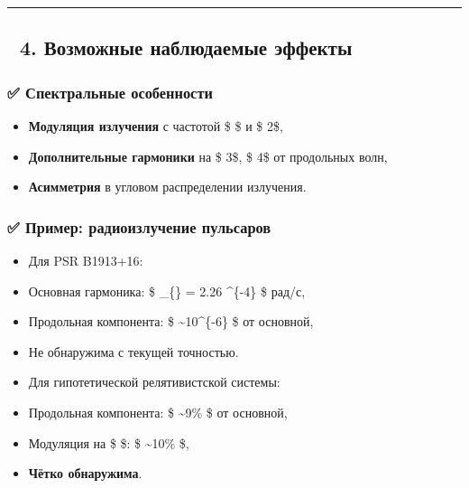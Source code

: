 \documentclass[11pt]{article}
\providecommand{\tightlist}{%
      \setlength{\itemsep}{0pt}\setlength{\parskip}{0pt}}
\begin{document}
\begin{center}\rule{0.5\linewidth}{\linethickness}\end{center}

\subsection{🔹 4. Возможные наблюдаемые
эффекты}\label{ux432ux43eux437ux43cux43eux436ux43dux44bux435-ux43dux430ux431ux43bux44eux434ux430ux435ux43cux44bux435-ux44dux444ux444ux435ux43aux442ux44b}

\subsubsection{✅ Спектральные
особенности}\label{ux441ux43fux435ux43aux442ux440ux430ux43bux44cux43dux44bux435-ux43eux441ux43eux431ux435ux43dux43dux43eux441ux442ux438}

\begin{itemize}
\tightlist
\item
  \textbf{Модуляция излучения} с частотой \$ \omega \$ и \$ 2\omega \$,
\item
  \textbf{Дополнительные гармоники} на \$ 3\omega \$, \$ 4\omega \$ от
  продольных волн,
\item
  \textbf{Асимметрия} в угловом распределении излучения.
\end{itemize}

\subsubsection{✅ Пример: радиоизлучение
пульсаров}\label{ux43fux440ux438ux43cux435ux440-ux440ux430ux434ux438ux43eux438ux437ux43bux443ux447ux435ux43dux438ux435-ux43fux443ux43bux44cux441ux430ux440ux43eux432}

\begin{itemize}
\item
  Для PSR B1913+16:\\
\item
  Основная гармоника: \$ \omega\_\{\} = 2.26
  \^{}\{-4\} \$ рад/с,\\
\item
  Продольная компонента: \$ \sim 10\^{}\{-6\} \$ от основной,\\
\item
  Не обнаружима с текущей точностью.
\item
  Для гипотетической релятивистской системы:\\
\item
  Продольная компонента: \$ \sim 9\% \$ от основной,\\
\item
  Модуляция на \$ \omega \$: \$ \sim 10\% \$,\\
\item
  \textbf{Чётко обнаружима}.
\end{itemize}
\end{document}
